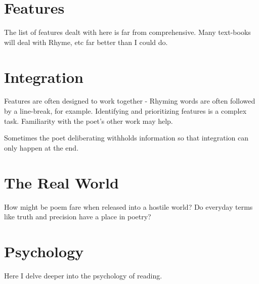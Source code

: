 \documentclass[11pt]{article}
\begin{document}
\section{Features}
The list of features dealt with here is far from comprehensive. Many text-books
will deal with Rhyme, etc far better than I could do. 

\section{Integration}
Features are often designed to work together - Rhyming words are often followed by a line-break, for example. Identifying and prioritizing features is a complex task. Familiarity with the poet's other work may help.

Sometimes the poet deliberating withholds information so that integration can only happen at the end.


\section{The Real World}

How might be poem fare when released into a hostile world? Do everyday terms like truth and precision have a place in poetry? 

\section{Psychology}

Here I delve deeper into the psychology of reading.
\end{document}
